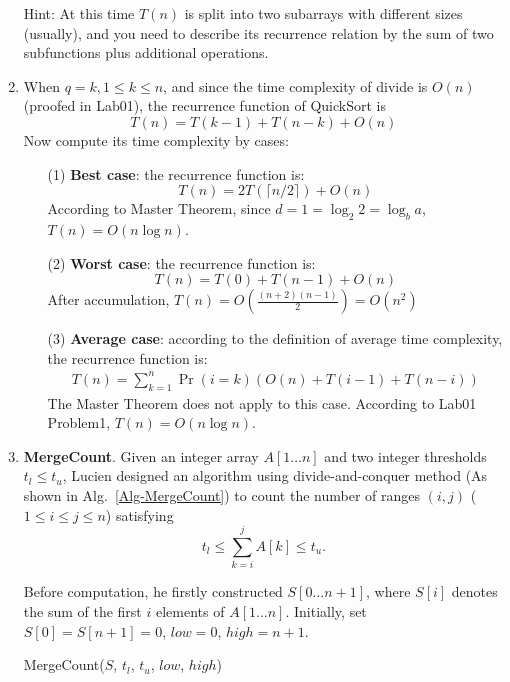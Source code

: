 \documentclass[12pt,a4paper,UTF8]{article}
\makeatletter
\newtheorem*{solution}{Solution}
\theoremstyle{definition}
\renewenvironment{solution}[1][Solution] {\par\pushQED{\qed}\normalfont\topsep6\p@\@plus6\p@\relax\trivlist\item[\hskip\labelsep\bfseries#1\@addpunct{.}]\ignorespaces}{\popQED\endtrivlist\@endpefalse} \makeatother
\makeatother
\begin{document}
\begin{enumerate}
    {\color{purple}Hint: At this time $T(n)$ is split into two subarrays with different sizes (usually), and you need to describe its recurrence relation by the sum of two subfunctions plus additional operations.}
    \begin{solution}
    	When $ q = k , 1\leq k \leq n$, and since the time complexity of divide is $ O(n) $(proofed in Lab01), the recurrence function of QuickSort is
    	$$ T(n) = T(k-1) + T(n-k) + O(n) $$
    	Now compute its time complexity by cases:
    	\begin{enumerate}
    		\item[(1)] \textbf{Best case}: the recurrence function is:
    		$$ T(n) = 2T(\lceil n/2\rceil) + O(n) $$
    		According to Master Theorem, since $ d=1 = \log_2 2 = \log_b a$, $ T(n) = O(n\log n) $.
    		\item[(2)] \textbf{Worst case}: the recurrence function is:
    		$$ T(n) = T(0) + T(n-1) + O(n) $$
    		After accumulation, $ T(n) = O(\frac{(n + 2)(n-1)}{2}) = O(n^2) $
    		\item[(3)] \textbf{Average case}: according to the definition of average time complexity, the recurrence function is:
    		\begin{align*}
    		T(n) = \sum_{k = 1}^{n} \Pr(i=k)(O(n)+T(i-1)+T(n - i))
    		\end{align*}
    		The Master Theorem does not apply to this case. According to Lab01 Problem1, $ T(n) = O(n\log n) $.
    	\end{enumerate} 
    \end{solution}

    \item
    \textbf{MergeCount}. Given an integer array $A[1 \ldots n]$ and two integer thresholds $t_l \le t_u$, Lucien designed an algorithm using divide-and-conquer method (As shown in Alg.~\ref{Alg-MergeCount}) to count the number of ranges $(i,j)$ ($1 \leq i \leq j \leq n$) satisfying
    \begin{equation}\label{Eqn-MergeCount}
    t_l \leq \sum_{k=i}^{j}{A[k]} \leq t_u.
    \end{equation}

    Before computation, he firstly constructed $S[0 \ldots n+1]$, where $S[i]$ denotes the sum of the first $i$ elements of $A[1 \ldots n]$. Initially, set $S[0]=S[n+1]=0$, $low=0$, $high=n+1$.

\begin{minipage}[t]{0.90\textwidth}
	\begin{algorithm}[H]
		\BlankLine
		\caption{MergeCount($S$, $t_l$, $t_u$, $low$, $high$)}
		\label{Alg-MergeCount}
		

\end{algorithm}
\end{minipage}
\end{enumerate}
\end{document}
